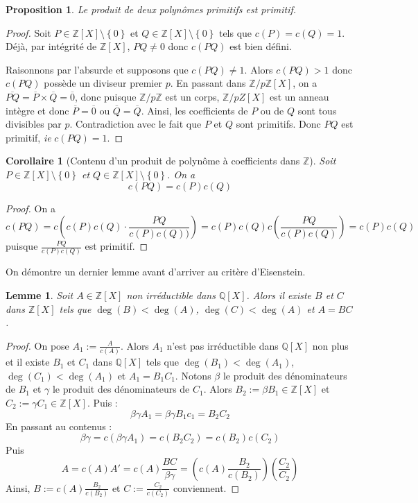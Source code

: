 \documentclass[french]{book}
\newcommand{\Z}{\mathbb{Z}}
\newcommand{\Q}{\mathbb{Q}}
\theoremstyle{plain}
\newtheorem{lem}{Lemme}[chapter]
\newtheorem{prop}{Proposition}[chapter]
\newtheorem{cor}{Corollaire}[chapter]
\theoremstyle{definition}
\theoremstyle{remark}
\begin{document}
\begin{prop}
	Le produit de deux polynômes primitifs est primitif.
\end{prop}
\begin{proof}
	Soit $P\in\Z[X]\setminus\left\{0\right\}$ et $Q\in\Z[X]\setminus\left\{0\right\}$ tels que $c(P)=c(Q)=1$. Déjà, par intégrité de $\Z[X]$, $PQ\ne0$ donc $c(PQ)$ est bien défini. \par Raisonnons par l'absurde et supposons que $c(PQ)\ne1$. Alors $c(PQ)>1$ donc $c(PQ)$ possède un diviseur premier $p$. En passant dans $\Z/p\Z[X]$, on a $\overline{PQ}=\overline{P}\times\overline{Q}=\overline{0}$, donc puisque $\Z/p\Z$ est un corps, $\Z/pZ[X]$ est un anneau intègre et donc $\overline{P}=\overline{0}$ ou $\overline{Q}=\overline{Q}$. Ainsi, les coefficients de $P$ ou de $Q$ sont tous divisibles par $p$. Contradiction avec le fait que $P$ et $Q$ sont primitifs. Donc $PQ$ est primitif, \textit{ie} $c(PQ)=1$.
\end{proof}
\begin{cor}[Contenu d'un produit de polynôme à coefficients dans $\Z$]
	Soit $P\in\Z[X]\setminus\left\{0\right\}$ et $Q\in\Z[X]\setminus\left\{0\right\}$. On a $$c(PQ)=c(P)c(Q)$$
\end{cor}
\begin{proof}
	On a $$c(PQ)=c\left(c(P)c(Q)\cdot\frac{PQ}{c(P)c(Q))}\right)=c(P)c(Q)c\left(\frac{PQ}{c(P)c(Q)}\right)=c(P)c(Q)$$ puisque $\displaystyle\frac{PQ}{c(P)c(Q)}$ est primitif. 
\end{proof}
On démontre un dernier lemme avant d'arriver au critère d'Eisenstein.
\begin{lem}
	Soit $A\in\Z[X]$ non irréductible dans $\Q[X]$. Alors il existe $B$ et $C$ dans $\Z[X]$ tels que $\deg(B)<\deg(A)$, $\deg(C)<\deg(A)$ et $A=BC$.
\end{lem}
\begin{proof}
	On pose $A_1:=\displaystyle\frac{A}{c(A)}$. Alors $A_1$ n'est pas irréductible dans $\Q[X]$ non plus et il existe $B_1$ et $C_1$ dans $\Q[X]$ tels que $\deg(B_1)<\deg(A_1)$, $\deg(C_1)<\deg(A_1)$ et $A_1=B_1C_1$. Notons $\beta$ le produit des dénominateurs de $B_1$ et $\gamma$ le produit des dénominateurs de $C_1$. Alors $B_2:=\beta B_1\in\Z[X]$ et $C_2:=\gamma C_1\in\Z[X]$. Puis : $$\beta\gamma A_1=\beta\gamma B_1c_1=B_2C_2$$ En passant au contenus : $$\beta\gamma =c(\beta\gamma A_1)=c(B_2C_2)=c(B_2)c(C_2)$$ Puis $$A=c(A)A'=c(A)\frac{BC}{\beta\gamma}=\left(c(A)\frac{B_2}{c(B_2)}\right)\left(\frac{C_2}{C_2}\right)$$ Ainsi, $\displaystyle B:=c(A)\frac{B_2}{c(B_2)}$ et $\displaystyle C:=\frac{C_2}{c(C_2)}$ conviennent.
\end{proof}
\end{document}
